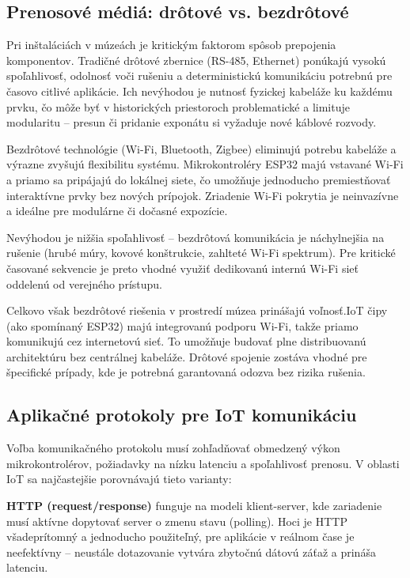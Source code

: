 \subsection{Prenosové médiá: drôtové vs. bezdrôtové}
\label{prenosove-media}

Pri inštaláciách v múzeách je kritickým faktorom spôsob prepojenia komponentov. Tradičné drôtové zbernice (RS-485, Ethernet) ponúkajú vysokú spoľahlivosť, odolnosť voči rušeniu a deterministickú komunikáciu potrebnú pre časovo citlivé aplikácie. Ich nevýhodou je nutnosť fyzickej kabeláže ku každému prvku, čo môže byť v historických priestoroch problematické a limituje modularitu -- presun či pridanie exponátu si vyžaduje nové káblové rozvody.

Bezdrôtové technológie (Wi-Fi, Bluetooth, Zigbee) eliminujú potrebu kabeláže a výrazne zvyšujú flexibilitu systému. Mikrokontroléry ESP32 majú vstavané Wi-Fi a priamo sa pripájajú do lokálnej siete, čo umožňuje jednoducho premiestňovať interaktívne prvky bez nových prípojok. Zriadenie Wi-Fi pokrytia je neinvazívne a ideálne pre modulárne či dočasné expozície.

Nevýhodou je nižšia spoľahlivosť -- bezdrôtová komunikácia je náchylnejšia na rušenie (hrubé múry, kovové konštrukcie, zahlteté Wi-Fi spektrum). Pre kritické časované sekvencie je preto vhodné využiť dedikovanú internú Wi-Fi sieť oddelenú od verejného prístupu.

Celkovo však bezdrôtové riešenia v prostredí múzea prinášajú voľnosť.IoT čipy (ako spomínaný ESP32) majú integrovanú podporu Wi-Fi, takže priamo komunikujú cez internetovú sieť. To umožňuje budovať plne distribuovanú architektúru bez centrálnej kabeláže. Drôtové spojenie zostáva vhodné pre špecifické prípady, kde je potrebná garantovaná odozva bez rizika rušenia.

\subsection{Aplikačné protokoly pre IoT komunikáciu}
\label{aplikacne-protokoly}

Voľba komunikačného protokolu musí zohľadňovať obmedzený výkon mikrokontrolérov, požiadavky na nízku latenciu a spoľahlivosť prenosu. V oblasti IoT sa najčastejšie porovnávajú tieto varianty:

\textbf{HTTP (request/response)} funguje na modeli klient-server, kde zariadenie musí aktívne dopytovať server o zmenu stavu (polling). Hoci je HTTP všadeprítomný a jednoducho použiteľný, pre aplikácie v reálnom čase je neefektívny -- neustále dotazovanie vytvára zbytočnú dátovú záťaž a prináša latenciu.

